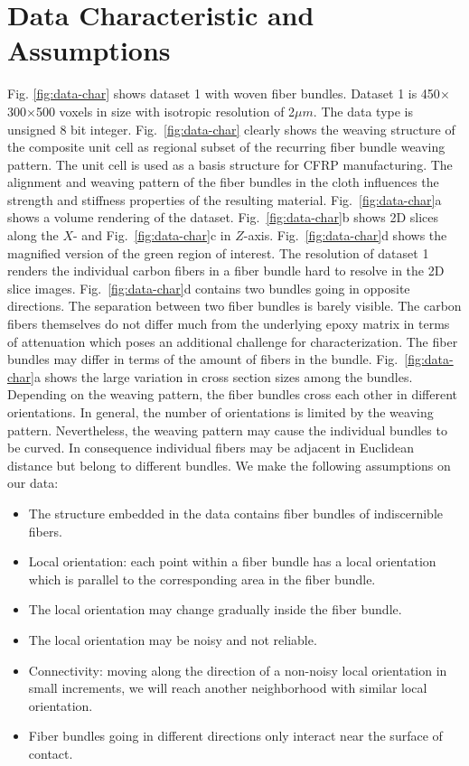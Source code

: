 \section {Data Characteristic and Assumptions}
\label{sec:char_data}
Fig. \ref{fig:data-char} shows dataset 1 with woven fiber bundles. Dataset 1 is 450$\times$300$\times$500 voxels in size with isotropic resolution of 2$\mu m$. The data type is unsigned 8 bit integer. Fig.~\ref{fig:data-char} clearly shows the weaving structure of the composite unit cell as regional subset of the recurring fiber bundle weaving pattern. The unit cell is used as a basis structure for CFRP manufacturing. The alignment and weaving pattern of the fiber bundles in the cloth influences the strength and stiffness properties of the resulting material. Fig.~\ref{fig:data-char}a shows a volume rendering of the dataset. Fig.~\ref{fig:data-char}b shows 2D slices along the $X$- and Fig.~\ref{fig:data-char}c in $Z$-axis. Fig.~\ref{fig:data-char}d shows the magnified version of the green region of interest. 
The resolution of dataset 1 renders the individual carbon fibers in a fiber bundle hard to resolve in the 2D slice images. Fig.~\ref{fig:data-char}d contains two bundles going in opposite directions. The separation between two fiber bundles is barely visible. The carbon fibers themselves do not differ much from the underlying epoxy matrix in terms of attenuation which poses an additional challenge for characterization. The fiber bundles may differ in terms of the amount of fibers in the bundle. Fig.~\ref{fig:data-char}a shows the large variation in cross section sizes among the bundles.
Depending on the weaving pattern, the fiber bundles cross each other in different orientations. In general, the number of orientations is limited by the weaving pattern. Nevertheless, the weaving pattern may cause the individual bundles to be curved. In consequence individual fibers may be adjacent in Euclidean distance but belong to different bundles. 
We make the following assumptions on our data:
\begin{itemize}[noitemsep]
\item The structure embedded in the data contains fiber bundles of indiscernible fibers.
\item Local orientation: each point within a fiber bundle has a local orientation which is parallel to the corresponding area in the fiber bundle.
\item The local orientation may change gradually inside the fiber bundle.
\item The local orientation may be noisy and not reliable.
\item Connectivity: moving along the direction of a non-noisy local orientation in small increments, we will reach another neighborhood with similar local orientation.
\item Fiber bundles going in different directions only interact near the surface of contact.
\end{itemize}

